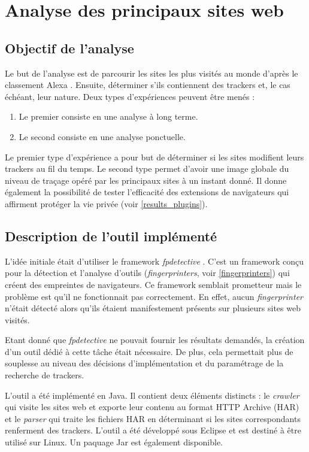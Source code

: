 \chapter{Analyse des principaux sites web}
\section{Objectif de l'analyse}
Le but de l'analyse est de parcourir les sites les plus visités au monde d'après le classement Alexa \cite{AlexaTop}. Ensuite, déterminer s'ils contiennent des trackers et, le cas échéant, leur nature. Deux types d'expériences peuvent être menés :
\begin{enumerate}
	\item Le premier consiste en une analyse à long terme.
	\item Le second consiste en une analyse ponctuelle.
\end{enumerate}

Le premier type d'expérience a pour but de déterminer si les sites modifient leurs trackers au fil du temps.
Le second type permet d'avoir une image globale du niveau de traçage opéré par les principaux sites à un instant donné. Il donne également la possibilité de tester l'efficacité des extensions de navigateurs qui affirment protéger la vie privée (voir \autoref{results_plugins}).

\section{Description de l'outil implémenté}
L'idée initiale était d'utiliser le framework \textit{fpdetective} \cite{Acar:2013:FDW:2508859.2516674}. C'est un framework conçu pour la détection et l'analyse d'outils (\textit{fingerprinters}, voir \autoref{fingerprinters}) qui créent des empreintes de navigateurs. Ce framework semblait prometteur mais le problème est qu'il ne fonctionnait pas correctement. En effet, aucun \textit{fingerprinter} n'était détecté alors qu'ils étaient manifestement présents sur plusieurs sites web visités.

Etant donné que \textit{fpdetective} ne pouvait fournir les résultats demandés, la création d'un outil dédié à cette tâche était nécessaire. De plus, cela permettait plus de souplesse au niveau des décisions d'implémentation et du paramétrage de la recherche de trackers.
\newline

L'outil a été implémenté en Java. Il contient deux éléments distincts : le \textit{crawler} qui visite les sites web et exporte leur contenu au format HTTP Archive (HAR) et le \textit{parser} qui traite les fichiers HAR en déterminant si les sites correspondants renferment des trackers.
L'outil a été développé sous Eclipse et est destiné à être utilisé sur Linux. Un paquage Jar est également disponible.
\newline

